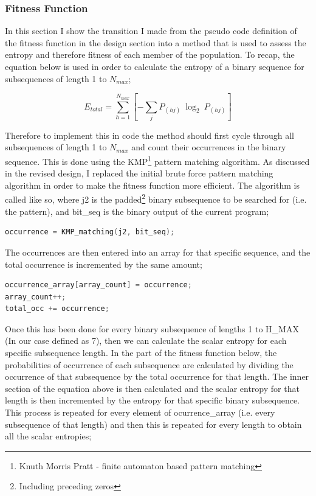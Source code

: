\documentclass[a4paper,10.5pt]{article}
\begin{document}
\subsubsection{Fitness Function}
In this section I show the transition I made from the pseudo code definition of the fitness function in the design section into a method that is used to assess the entropy and therefore fitness of each member of the population. To recap, the equation below is used in order to calculate the entropy of a binary sequence for subsequences of length 1 to $N_{max}$;

\begin{equation*}
E_{total} = \sum_{h = 1}^{N_{max}} \left[ - \sum_{j} P_{(hj)}\ \log_2\ P_{(hj)} \right]
\end{equation*}

Therefore to implement this in code the method should first cycle through all subsequences of length 1 to $N_{max}$ and count their occurrences in the binary sequence. This is done using the KMP\footnote{Knuth Morris Pratt - finite automaton based pattern matching} pattern matching algorithm. As discussed in the revised design, I replaced the initial brute force pattern matching algorithm in order to make the fitness function more efficient. The algorithm is called like so, where j2 is the padded\footnote{Including preceding zeros} binary subsequence to be searched for (i.e. the pattern), and bit\_seq is the binary output of the current program;
\begin{lstlisting}[language=C]
occurrence = KMP_matching(j2, bit_seq);
\end{lstlisting}

The occurrences are then entered into an array for that specific sequence, and the total occurrence is incremented by the same amount;
\begin{lstlisting}[language=C]
occurrence_array[array_count] = occurrence;
array_count++;
total_occ += occurrence;
\end{lstlisting}

Once this has been done for every binary subsequence of lengths 1 to H\_MAX (In our case defined as 7), then we can calculate the scalar entropy for each specific subsequence length. In the part of the fitness function below, the probabilities of occurrence of each subsequence are calculated by dividing the occurrence of that subsequence by the total occurrence for that length. The inner section of the equation above is then calculated and the scalar entropy for that length is then incremented by the entropy for that specific binary subsequence. This process is repeated for every element of ocurrence\_array (i.e. every subsequence of that length) and then this is repeated for every length to obtain all the scalar entropies;
\end{document}
